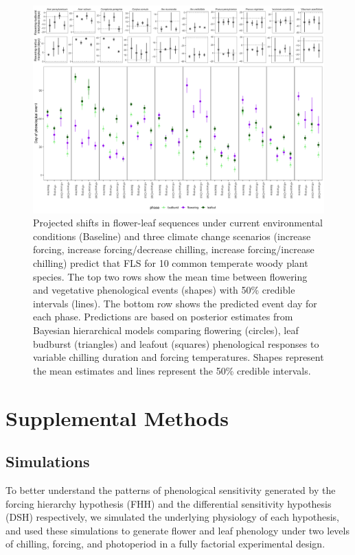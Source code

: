 \documentclass{article}\usepackage[]{graphicx}\usepackage[]{color}
\begin{document}
 \begin{figure}[!ht]
    \centering
 \includegraphics[width=\textwidth]{..//Plots/species_projections.png}
    \caption{Projected shifts in flower-leaf sequences under current environmental conditions (Baseline) and three climate change scenarios (increase forcing, increase forcing/decrease chilling, increase forcing/increase chilling) predict that FLS for 10 common temperate woody plant species. The top two rows show the mean time between flowering and vegetative phenological events (shapes) with 50\% credible intervals (lines). The bottom row shows the predicted event day for each phase. Predictions are based on posterior estimates from Bayesian hierarchical models comparing flowering (circles), leaf budburst (triangles) and leafout (squares) phenological responses to variable chilling duration and forcing temperatures. Shapes represent the mean estimates and lines represent the 50\% credible intervals. }
    \label{fig:preddy_sp}
\end{figure}


\section*{Supplemental Methods}
\subsection*{Simulations}
\noident To better understand the patterns of phenological sensitivity generated by the forcing hierarchy hypothesis (FHH) and the differential sensitivity hypothesis (DSH) respectively, we simulated the underlying physiology of each hypothesis, and used these simulations to generate flower and leaf phenology under two levels of chilling, forcing, and photoperiod in a fully factorial experimental design.\\
\end{document}
